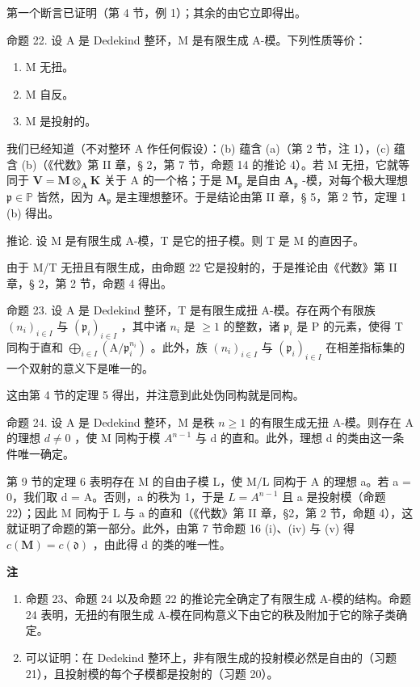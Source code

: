 第一个断言已证明（第 4 节，例 1）；其余的由它立即得出。

命题 22. 设 A 是 Dedekind 整环，M 是有限生成 A-模。下列性质等价：

\begin{enumerate}
\def\labelenumi{(\alph{enumi})}
\item
  M 无扭。
\item
  M 自反。
\item
  M 是投射的。
\end{enumerate}

我们已经知道（不对整环 A 作任何假设）：(b) 蕴含 (a)（第 2 节，注 1），(c) 蕴含 (b)（《代数》第 II 章，§ 2，第 7 节，命题 14 的推论 4）。若 M 无扭，它就等同于 \(\mathbf{V} = \mathbf{M} \otimes_{\mathbf{A}} \mathbf{K}\) 关于 A 的一个格；于是 \(\mathbf{M}_{\mathfrak{p}}\) 是自由 \(\mathbf{A}_{\mathfrak{p}}\) -模，对每个极大理想 \(\mathfrak{p} \in \mathbb{P}\) 皆然，因为 \(\mathbf{A}_{\mathfrak{p}}\) 是主理想整环。于是结论由第 II 章，§ 5，第 2 节，定理 1 (b) 得出。

推论. 设 M 是有限生成 A-模，T 是它的扭子模。则 T 是 M 的直因子。

由于 M/T 无扭且有限生成，由命题 22 它是投射的，于是推论由《代数》第 II 章，§ 2，第 2 节，命题 4 得出。

命题 23. 设 A 是 Dedekind 整环，T 是有限生成扭 A-模。存在两个有限族 \((n_{i})_{i\in I}\) 与 \((\mathfrak{p}_i)_{i\in I}\) ，其中诸 \(n_i\) 是 \(\geqslant 1\) 的整数，诸 \(\mathfrak{p}_i\) 是 P 的元素，使得 T 同构于直和 \(\bigoplus_{i\in I} (\mathrm{A} / \mathfrak{p}_{i}^{n_i})\) 。此外，族 \((n_{i})_{i\in I}\) 与 \((\mathfrak{p}_i)_{i\in I}\) 在相差指标集的一个双射的意义下是唯一的。

这由第 4 节的定理 5 得出，并注意到此处伪同构就是同构。

命题 24. 设 A 是 Dedekind 整环，M 是秩 \(n \geqslant 1\) 的有限生成无扭 A-模。则存在 A 的理想 \(d \neq 0\) ，使 M 同构于模 \(A^{n-1}\) 与 d 的直和。此外，理想 d 的类由这一条件唯一确定。

第 9 节的定理 6 表明存在 M 的自由子模 L，使 M/L 同构于 A 的理想 a。若 a = 0，我们取 d = A。否则，a 的秩为 1，于是 \(L = A^{n-1}\) 且 a 是投射模（命题 22）；因此 M 同构于 L 与 a 的直和（《代数》第 II 章，§2，第 2 节，命题 4），这就证明了命题的第一部分。此外，由第 7 节命题 16 (i)、(iv) 与 (v) 得 \(c(\mathbf{M}) = c(\mathfrak{d})\) ，由此得 d 的类的唯一性。

\textbf{注}\par

\begin{enumerate}
\def\labelenumi{(\arabic{enumi})}
\item
  命题 23、命题 24 以及命题 22 的推论完全确定了有限生成 A-模的结构。命题 24 表明，无扭的有限生成 A-模在同构意义下由它的秩及附加于它的除子类确定。
\item
  可以证明：在 Dedekind 整环上，非有限生成的投射模必然是自由的（习题 21），且投射模的每个子模都是投射的（习题 20）。
\end{enumerate}


